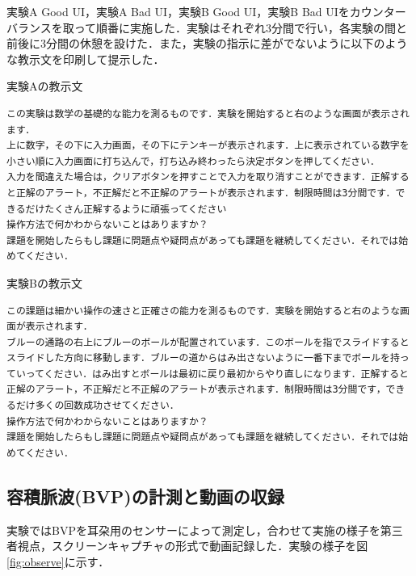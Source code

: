 実験A Good UI，実験A Bad UI，実験B Good UI，実験B Bad UIをカウンターバランスを取って順番に実施した．実験はそれぞれ3分間で行い，各実験の間と前後に3分間の休憩を設けた．また，実験の指示に差がでないように以下のような教示文を印刷して提示した．

\begin{itembox}[l]{実験Aの教示文}
\begin{verbatim}
この実験は数学の基礎的な能力を測るものです．実験を開始すると右のような画面が表示されます．
上に数字，その下に入力画面，その下にテンキーが表示されます．上に表示されている数字を小さい順に入力画面に打ち込んで，打ち込み終わったら決定ボタンを押してください．
入力を間違えた場合は，クリアボタンを押すことで入力を取り消すことができます．正解すると正解のアラート，不正解だと不正解のアラートが表示されます．制限時間は3分間です．できるだけたくさん正解するように頑張ってください
操作方法で何かわからないことはありますか？
課題を開始したらもし課題に問題点や疑問点があっても課題を継続してください．それでは始めてください．
\end{verbatim}
\end{itembox}

\begin{itembox}[l]{実験Bの教示文}
\begin{verbatim}
この課題は細かい操作の速さと正確さの能力を測るものです．実験を開始すると右のような画面が表示されます．
ブルーの通路の右上にブルーのボールが配置されています．このボールを指でスライドするとスライドした方向に移動します．ブルーの道からはみ出さないように一番下までボールを持っていってください．はみ出すとボールは最初に戻り最初からやり直しになります．正解すると正解のアラート，不正解だと不正解のアラートが表示されます．制限時間は3分間です，できるだけ多くの回数成功させてください．
操作方法で何かわからないことはありますか？
課題を開始したらもし課題に問題点や疑問点があっても課題を継続してください．それでは始めてください．
\end{verbatim}
\end{itembox}

\subsection{容積脈波(BVP)の計測と動画の収録}

実験ではBVPを耳朶用のセンサーによって測定し，合わせて実施の様子を第三者視点，スクリーンキャプチャの形式で動画記録した．実験の様子を図\ref{fig:observe}に示す．


